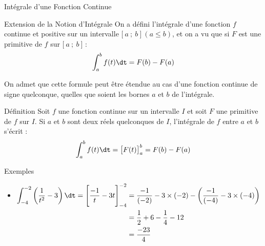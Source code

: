 \documentclass{cours}
\begin{document}
    \begin{Gpartie}{Intégrale d'une Fonction Continue} 
        \begin{Spartie}{Extension de la Notion d'Intégrale} 
            On a défini l'intégrale d'une fonction $f$ continue et positive sur un intervalle $\big[~a~;~b~\big]~\left(a\leq b\right)$, et on a vu que si $F$ est une primitive de $f$ sur $\big[~a~;~b~\big]$ : \[\int_a^b f(t)\dt=F(b)-F(a)\]

            On admet que cette formule peut être étendue au cas d'une fonction continue de signe quelconque, quelles que soient les bornes $a$ et $b$ de l'intégrale.

            \begin{SSpartie}{Définition} 
                Soit $f$ une fonction continue sur un intervalle $I$ et soit $F$ une primitive de $f$ sur $I$. Si $a$ et $b$ sont deux réels quelconques de $I$, l'intégrale de $f$ entre $a$ et $b$ s'écrit : \[\int_a^b f(t)\dt=\big[F(t)\big]_a^b=F(b)-F(a)\]
            \end{SSpartie}
            \begin{SSpartie}{Exemples} 
                \begin{itemize}
                    \item   
                    $\begin{aligned}[t]
                        \int_{-4}^{-2}\left(\frac{1}{t^2}-3\right)\dt=\Bigg[\frac{-1}{t}-3t\Bigg]_{-4}^{-2}&=\frac{-1}{(-2)}-3\times(-2)-\left(\frac{-1}{(-4)}-3\times(-4)\right)  \\
                        &=\frac{1}{2}+6-\frac{1}{4}-12 \\
                        &=\frac{-23}{4}
                    \end{aligned}$


\end{itemize}
\end{SSpartie}
\end{Spartie}
\end{Gpartie}
\end{document}
